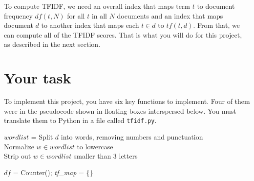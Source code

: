 \begin{fullwidth}
To compute TFIDF, we need an overall index that maps term $t$ to document frequency $df(t,N)$ for all $t$ in all $N$ documents and an index that maps document $d$ to another index that maps each $t \in d$ to $tf(t,d)$. From that, we can compute all of the TFIDF scores.  That is what you will do for this project, as described in the next section.

\section{Your task}

To implement this project, you have six key functions to implement.   Four of them were in the pseudocode shown in  floating boxes interspersed below. You must translate them to Python in a file called {\tt tfidf.py}.

\begin{function}
\vspace{-4pt}
\Indp
 $wordlist$ = Split $d$ into words, removing numbers and punctuation\\
 Normalize $w \in wordlist$ to lowercase\\
 Strip out $w \in wordlist$ smaller than 3 letters\\
\end{function}

\begin{function}
\vspace{-4pt}
\Indp
$df$ = Counter(); {\em tf\_map} = \{\}\\
\end{function}


\end{fullwidth}
